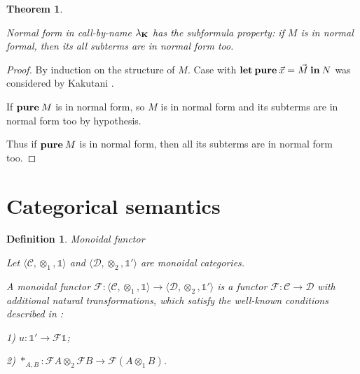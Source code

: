 \documentclass[a4paper]{article}
\newtheorem{theorem}{Theorem}
\newtheorem{defin}{Definition}
\begin{document}
\begin{theorem}
  $ $

  Normal form in call-by-name $\lambda_{{\bf K}}$ has the subformula property: if $M$ is in normal formal, then its all subterms are in normal form too.

\end{theorem}

\begin{proof}
  By induction on the structure of $M$.
  Case with ${\bf let \: pure\:} \vec{x} = \vec{M} {\: \bf in \:} N$ was considered by Kakutani \cite{ModalK} \cite{ModalK1}.

  If ${\bf pure \:} M$ is in normal form, so $M$ is in normal form and its subterms are in normal form too by hypothesis.

  Thus if ${\bf pure \:} M$ is in normal form, then all its subterms are in normal form too.
\end{proof}

\section{Categorical semantics}

\begin{defin} Monoidal functor

  Let $\langle \mathcal{C}, \otimes_1, \mathds{1} \rangle$ and $\langle \mathcal{D}, \otimes_2, \mathds{1}' \rangle$ are monoidal categories.

  A monoidal functor $\mathcal{F} : \langle \mathcal{C}, \otimes_1, \mathds{1} \rangle \to \langle \mathcal{D}, \otimes_2, \mathds{1}' \rangle$ is a functor
  $\mathcal{F} : \mathcal{C} \to \mathcal{D}$ with additional natural transformations, which satisfy the well-known conditions described in \cite{ElKelly}:

  1) $u : \mathds{1}' \to \mathcal{F}\mathds{1}$;

  2) $\ast_{A, B} : \mathcal{F}A \otimes_2 \mathcal{F}B \to \mathcal{F}(A \otimes_1 B)$.

\end{defin}
\end{document}
